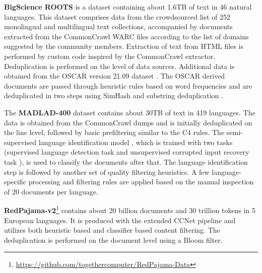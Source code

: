 \textbf{BigScience ROOTS} \cite{laurenccon_saulnier_etal2022} is a dataset containing about 1.6TB of text in 46 natural languages.
This dataset comprises data from the crowdsourced list of 252 monolingual
and multilingual text collections, accompanied by documents extracted from the
CommonCrawl WARC files according to the list of domains suggested by the community
members. Extraction of text from HTML files is performed by custom code
inspired by the CommonCrawl extractor. Deduplication is performed on the level
of data sources. Additional data is obtained from the OSCAR version
21.09 dataset \cite{suarez_etal2020}. The OSCAR derived documents are passed through heuristic rules
based on word frequencies and are deduplicated in two steps using SimHash \cite{charikar2002,manku_jain_etal2007} and substring deduplication \cite{lee_ippolito_etal2022,manber_myers1993}.

The \textbf{MADLAD-400} \cite{kudugunta_caswell_etal2024} dataset contains about 30TB of text in 419 languages. The data
is obtained from the CommonCrawl dumps and is initially deduplicated on the line
level, followed by basic prefiltering similar to the C4 rules.
The semi-supervised language identification model
\cite{caswell_breiner_etal2020}, which is trained
with two tasks (supervised language detection task and
unsupervised corrupted input recovery task \cite{raffel_shazeer_etal2020}),
is used to classify the documents after that.
The language identification step is followed by another
set of quality filtering heuristics.
A few language-specific processing and filtering rules are applied based on the
manual inspection of 20 documents per language.


\textbf{RedPajama-v2}\footnote{\url{https://github.com/togethercomputer/RedPajama-Data}} 
contains about 20 billion documents and 30 trillion tokens
in 5 European languages.
It is produced with the extended CCNet pipeline and utilizes both heuristic based
and classifier based content filtering. The deduplication is performed on the document level using a Bloom filter.

